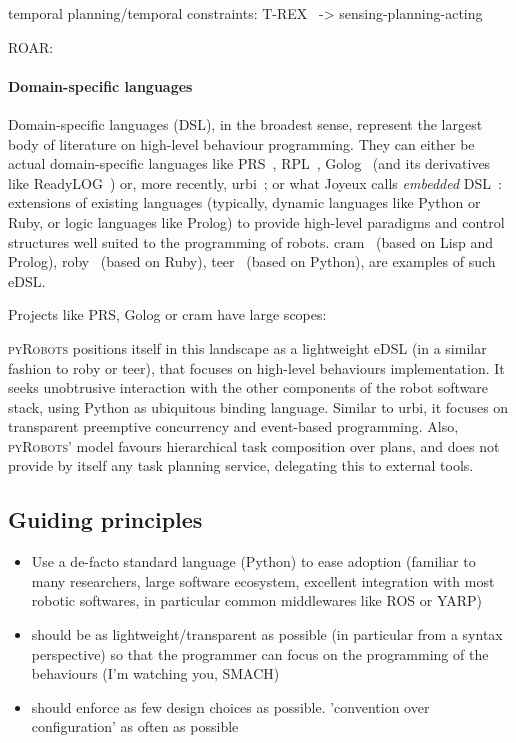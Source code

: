 \documentclass[a4paper, 10pt, conference]{ieeeconf}      %
\newcommand{\pyRobots}{\textsc{pyRobots}}
\begin{document}
temporal planning/temporal constraints: T-REX~\cite{mcgann2007trex} -> sensing-planning-acting

ROAR: ~\cite{degroote2011roar}

\paragraph{Domain-specific languages}

Domain-specific languages (DSL), in the broadest sense, represent the largest
body of literature on high-level behaviour programming. They can either be
actual domain-specific languages like PRS~\cite{ingrand1996prs},
RPL~\cite{mcdermott1993reactive}, Golog~\cite{levesque1997golog} (and its
derivatives like {\sc ReadyLOG}~\cite{ferrein2007robot}) or, more recently, {\sc
urbi}~\cite{baillie2005urbi}; or what Joyeux calls \emph{embedded}
DSL~\cite{joyeux2011robot}: extensions of existing languages (typically, dynamic
languages like Python or Ruby, or logic languages like Prolog) to provide
high-level paradigms and control structures well suited to the programming of
robots. {\sc cram}~\cite{beetz2010cram} (based on Lisp and Prolog), {\sc
roby}~\cite{joyeux2009plan} (based on Ruby), {\sc teer}~\cite{magnenat2012teer}
(based on Python), are examples of such eDSL.

Projects like PRS, Golog or {\sc cram} have large scopes:


\pyRobots{} positions itself in this landscape as a lightweight eDSL (in a similar
fashion to {\sc roby} or {\sc teer}), that focuses on high-level behaviours
implementation. It seeks unobtrusive interaction with the other components of
the robot software stack, using Python as ubiquitous binding language. Similar
to {\sc urbi}, it focuses on transparent preemptive concurrency and event-based programming.
Also, \pyRobots{}' model favours hierarchical task composition over plans, and does not
provide by itself any task planning service, delegating this to external tools.

\subsection{Guiding principles}

\begin{itemize}
    \item Use a de-facto standard language (Python) to ease adoption (familiar to
        many researchers, large software ecosystem, excellent integration with
        most robotic softwares, in particular common middlewares like ROS or
        YARP)
    \item should be as lightweight/transparent as possible (in particular from a
        syntax perspective) so that the
        programmer can focus on the programming of the behaviours (I'm
        watching you, SMACH)
    \item should enforce as few design choices as possible. 'convention over
        configuration' as often as possible
\end{itemize}
\end{document}
